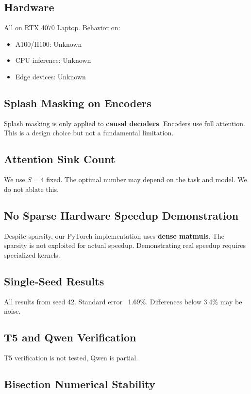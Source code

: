 \subsection{Hardware}

All on RTX 4070 Laptop. Behavior on:
\begin{itemize}
\item A100/H100: Unknown
\item CPU inference: Unknown
\item Edge devices: Unknown

\end{itemize}
\subsection{Splash Masking on Encoders}

Splash masking is only applied to \textbf{causal decoders}. Encoders use full 
attention. This is a design choice but not a fundamental limitation.

\subsection{Attention Sink Count}

We use $S = 4$ fixed. The optimal number may depend on the task and model. 
We do not ablate this.

\subsection{No Sparse Hardware Speedup Demonstration}

Despite sparsity, our PyTorch implementation uses \textbf{dense matmuls}. The 
sparsity is not exploited for actual speedup. Demonstrating real speedup 
requires specialized kernels.

\subsection{Single-Seed Results}

All results from seed 42. Standard error ~1.69\%. Differences below 
3.4\% may be noise.

\subsection{T5 and Qwen Verification}

T5 verification is not tested, Qwen is partial.

\subsection{Bisection Numerical Stability}


